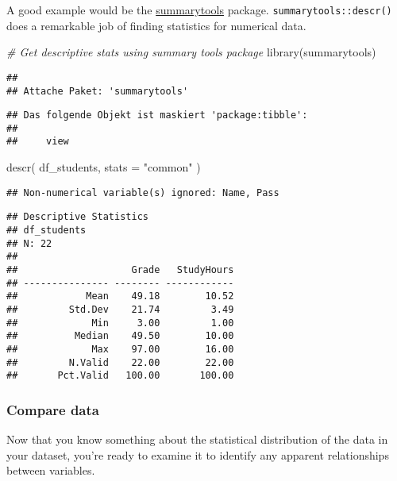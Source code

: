 \documentclass[
]{article}
\newenvironment{Shaded}{\begin{snugshade}}{\end{snugshade}}
\newcommand{\AttributeTok}[1]{\textcolor[rgb]{0.77,0.63,0.00}{#1}}
\newcommand{\CommentTok}[1]{\textcolor[rgb]{0.56,0.35,0.01}{\textit{#1}}}
\newcommand{\FunctionTok}[1]{\textcolor[rgb]{0.00,0.00,0.00}{#1}}
\newcommand{\NormalTok}[1]{#1}
\newcommand{\StringTok}[1]{\textcolor[rgb]{0.31,0.60,0.02}{#1}}
\begin{document}
A good example would be the
\href{https://github.com/dcomtois/summarytools}{summarytools} package.
\texttt{summarytools::descr()} does a remarkable job of finding
statistics for numerical data.

\begin{Shaded}
\begin{Highlighting}[]
\CommentTok{\# Get descriptive stats using summary tools package}
\FunctionTok{library}\NormalTok{(summarytools)}
\end{Highlighting}
\end{Shaded}

\begin{verbatim}
## 
## Attache Paket: 'summarytools'
\end{verbatim}

\begin{verbatim}
## Das folgende Objekt ist maskiert 'package:tibble':
## 
##     view
\end{verbatim}

\begin{Shaded}
\begin{Highlighting}[]
\FunctionTok{descr}\NormalTok{(}
\NormalTok{  df\_students,}
  \AttributeTok{stats =} \StringTok{"common"}
\NormalTok{)}
\end{Highlighting}
\end{Shaded}

\begin{verbatim}
## Non-numerical variable(s) ignored: Name, Pass
\end{verbatim}

\begin{verbatim}
## Descriptive Statistics  
## df_students  
## N: 22  
## 
##                    Grade   StudyHours
## --------------- -------- ------------
##            Mean    49.18        10.52
##         Std.Dev    21.74         3.49
##             Min     3.00         1.00
##          Median    49.50        10.00
##             Max    97.00        16.00
##         N.Valid    22.00        22.00
##       Pct.Valid   100.00       100.00
\end{verbatim}

\hypertarget{compare-data}{%
\subsubsection{Compare data}\label{compare-data}}

Now that you know something about the statistical distribution of the
data in your dataset, you're ready to examine it to identify any
apparent relationships between variables.
\end{document}
